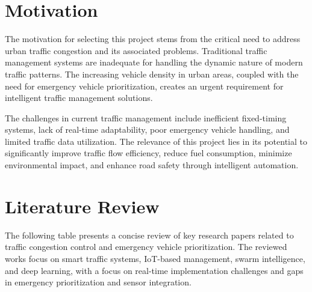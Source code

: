 \documentclass[12pt]{report}
\begin{document}
\section[Motivation]{\textbf{Motivation}}

The motivation for selecting this project stems from the critical need to address urban traffic congestion and its associated problems. Traditional traffic management systems are inadequate for handling the dynamic nature of modern traffic patterns. The increasing vehicle density in urban areas, coupled with the need for emergency vehicle prioritization, creates an urgent requirement for intelligent traffic management solutions.

The challenges in current traffic management include inefficient fixed-timing systems, lack of real-time adaptability, poor emergency vehicle handling, and limited traffic data utilization. The relevance of this project lies in its potential to significantly improve traffic flow efficiency, reduce fuel consumption, minimize environmental impact, and enhance road safety through intelligent automation.

\section[Literature Review]{\textbf{Literature Review}}

The following table presents a concise review of key research papers related to traffic congestion control and emergency vehicle prioritization. The reviewed works focus on smart traffic systems, IoT-based management, swarm intelligence, and deep learning, with a focus on real-time implementation challenges and gaps in emergency prioritization and sensor integration.
\end{document}
